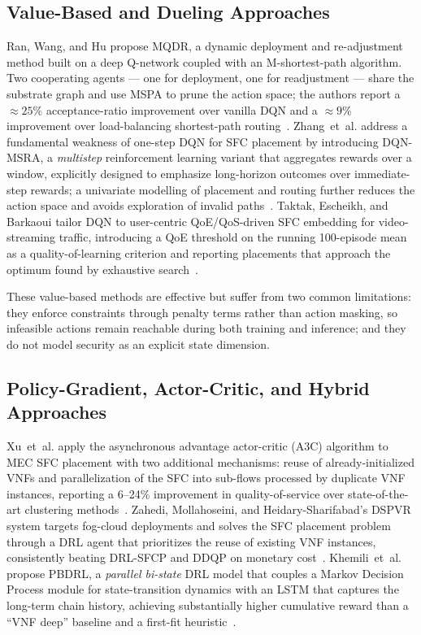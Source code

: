 \subsection{Value-Based and Dueling Approaches}

Ran, Wang, and Hu propose MQDR, a dynamic deployment and
re-adjustment method built on a deep Q-network coupled with an
M-shortest-path algorithm. Two cooperating agents --- one for
deployment, one for readjustment --- share the substrate graph and
use MSPA to prune the action space; the authors report a
${\approx}25\%$ acceptance-ratio improvement over vanilla DQN and
a ${\approx}9\%$ improvement over load-balancing shortest-path
routing~\cite{ran_dynamic_2023}. Zhang~et~al. address a fundamental
weakness of one-step DQN for SFC placement by introducing DQN-MSRA, a
\emph{multistep} reinforcement learning variant that aggregates
rewards over a window, explicitly designed to emphasize long-horizon
outcomes over immediate-step rewards; a univariate modelling of
placement and routing further reduces the action space and avoids
exploration of invalid paths~\cite{zhang_dqn-msra_2025}. Taktak,
Escheikh, and Barkaoui tailor DQN to user-centric QoE/QoS-driven
SFC embedding for video-streaming traffic, introducing a QoE
threshold on the running 100-episode mean as a quality-of-learning
criterion and reporting placements that approach the optimum found
by exhaustive search~\cite{taktak_drl_2024}.

These value-based methods are effective but suffer from two common
limitations: they enforce constraints through penalty terms rather
than action masking, so infeasible actions remain reachable during
both training and inference; and they do not model security as an
explicit state dimension.

\subsection{Policy-Gradient, Actor-Critic, and Hybrid Approaches}

Xu~et~al. apply the asynchronous advantage actor-critic (A3C)
algorithm to MEC SFC placement with two additional mechanisms:
reuse of already-initialized VNFs and parallelization of the SFC into
sub-flows processed by duplicate VNF instances, reporting a
6--24\% improvement in quality-of-service over state-of-the-art
clustering methods~\cite{xu_dynamic_2023}. Zahedi, Mollahoseini, and
Heidary-Sharifabad's DSPVR system targets fog-cloud deployments and
solves the SFC placement problem through a DRL agent that prioritizes
the reuse of existing VNF instances, consistently beating DRL-SFCP
and DDQP on monetary cost~\cite{zahedi_dspvr_2023}. Khemili~et~al.
propose PBDRL, a \emph{parallel bi-state} DRL model that couples a
Markov Decision Process module for state-transition dynamics with an
LSTM that captures the long-term chain history, achieving
substantially higher cumulative reward than a ``VNF deep'' baseline
and a first-fit heuristic~\cite{khemili_parallel_2024}.

